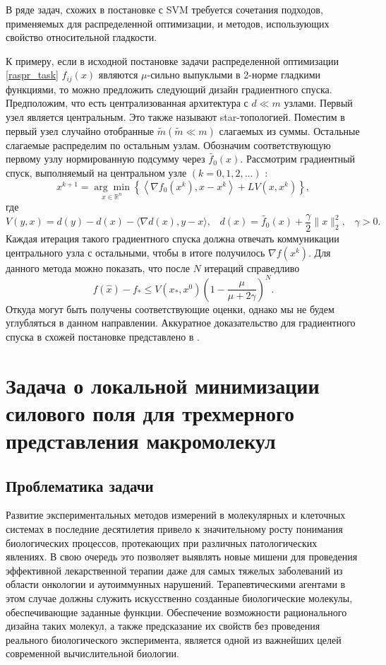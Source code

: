   В ряде задач, схожих в постановке с SVM требуется сочетания подходов, применяемых для распределенной оптимизации, и методов, использующих свойство относительной гладкости. 

  К примеру, если в исходной постановке задачи распределенной оптимизации \eqref{raspr_task} $f_{ij}(x)$ являются $\mu$-сильно выпуклыми в 2-норме гладкими функциями, то можно предложить следующий дизайн градиентного спуска. Предположим, что есть централизованная архитектура с $d \ll m$ узлами. Первый узел является центральным. Это также называют star-топологией. Поместим в первый узел случайно отобранные $\tilde{m}(\widetilde{m} \ll m)$ слагаемых из суммы. Остальные слагаемые распределим по остальным узлам. Обозначим соответствующую первому узлу нормированную подсумму через $\widetilde{f_0}(x)$. Рассмотрим градиентный спуск, выполняемый на центральном узле $(k=0,1,2, \ldots)$ :
  $$
    x^{k+1}=\underset{x \in \mathbb{R}^n}{\arg \min }\left\{\left\langle\nabla f_0\left(x^k\right), x - x^k\right\rangle+L V\left(x, x^k\right)\right\},
  $$
  где
  $$
    V(y, x)=d(y)-d(x)-\langle\nabla d(x), y-x\rangle,\;\;\;d(x)=\widetilde{f_0}(x)+\frac{\gamma}{2}\|x\|_2^2, \;\;\; \gamma>0 .
  $$
  Каждая итерация такого градиентного спуска должна отвечать коммуникации центрального узла с остальными, чтобы в итоге получилось $\nabla f\left(x^k\right)$.
  Для данного метода можно показать, что после $N$ итераций справедливо
  $$
    f(\hat{x})-f_* \leqslant V\left(x_*, x^0\right)\left(1-\frac{\mu}{\mu+2 \gamma}\right)^N.
  $$
  Откуда могут быть получены соответствующие оценки, однако мы не будем углубляться в данном направлении. Аккуратное доказательство для градиентного спуска в схожей постановке представлено в \cite{distrib_relative}. 


\section{Задача о локальной минимизации силового поля для трехмерного представления макромолекул} \label{sec:ch1/sec2}

\subsection{Проблематика задачи} \label{subsec:sec1/su1}
  Развитие экспериментальных методов измерений в молекулярных и клеточных системах в последние десятилетия привело к значительному росту понимания биологических процессов, протекающих при различных патологических явлениях.
  В свою очередь это позволяет выявлять новые мишени для проведения эффективной лекарственной терапии даже для самых тяжелых заболеваний из области онкологии и аутоиммунных нарушений.
  Терапевтическими агентами в этом случае должны служить искусственно созданные биологические молекулы, обеспечивающие заданные функции.
  Обеспечение возможности рационального дизайна таких молекул, а также предсказание их свойств без проведения реального биологического эксперимента, является одной из важнейших целей современной вычислительной биологии.

